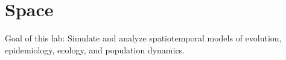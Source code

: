 \chapter{Space}

Goal of this lab:
Simulate and analyze spatiotemporal models of evolution, epidemiology, ecology, and population dynamics.

